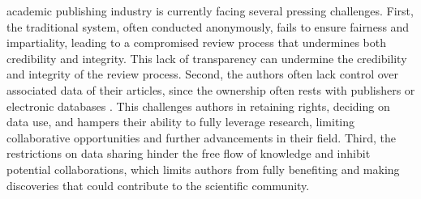 \documentclass[lettersize,journal]{IEEEtran}
\begin{document}
 academic publishing industry is currently facing several pressing challenges. First, the traditional system, often conducted anonymously, fails to ensure fairness and impartiality, leading to a compromised review process that undermines both credibility and integrity. This lack of transparency can undermine the credibility and integrity of the review process. Second,
the authors often lack control over associated data of their articles, since the ownership often rests with publishers or electronic databases \cite{lancaster1995evolution}. This challenges authors in retaining rights, deciding on data use, and hampers their ability to fully leverage research, limiting collaborative opportunities and further advancements in their field. Third, the restrictions on data sharing hinder the free flow of knowledge and inhibit potential collaborations, which limits authors from fully benefiting and making discoveries that could contribute to the scientific community.
\end{document}
